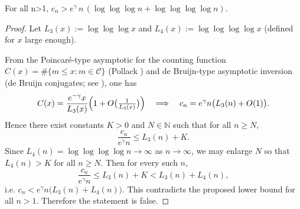 \begin{theorem}\label{thm:dusart_cyclics}
For all n>1, \(c_n>e^{\gamma}\,n\,(\log\log\log n+\log\log\log\log n)\).
\end{theorem}

\begin{proof}
Let $L_3(x):=\log\log\log x$ and $L_4(x):=\log\log\log\log x$ (defined for $x$ large enough).

From the Poincar\'e-type asymptotic for the counting function $C(x)=\#\{m\le x: m\in\mathcal C\}$ (Pollack \cite{Pollack2022}) and de Bruijn-type asymptotic inversion (de Bruijn conjugates; see \cite{deBruijn1970}), one has
$$
C(x)=\frac{e^{-\gamma}x}{L_3(x)}\Bigl(1+O\bigl(\tfrac{1}{L_3(x)}\bigr)\Bigr)
\quad\Longrightarrow\quad
c_n=e^{\gamma}n\bigl(L_3(n)+O(1)\bigr).
$$
Hence there exist constants $K>0$ and $N\in\mathbb N$ such that for all $n\ge N$,
$$
\frac{c_n}{e^{\gamma}n}\le L_3(n)+K.
$$
Since $L_4(n)=\log\log\log\log n\to\infty$ as $n\to\infty$, we may enlarge $N$ so that $L_4(n)>K$ for all $n\ge N$. Then for every such $n$,
$$
\frac{c_n}{e^{\gamma}n}\le L_3(n)+K< L_3(n)+L_4(n),
$$
i.e. $c_n< e^{\gamma}n\bigl(L_3(n)+L_4(n)\bigr)$. This contradicts the proposed lower bound for all $n>1$. Therefore the statement is false. 
\end{proof}

